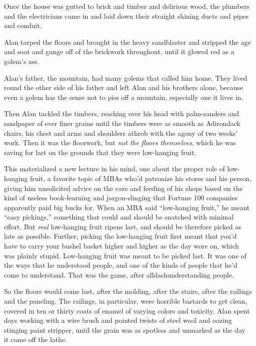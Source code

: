 Once the house was gutted to brick and timber and delirious wood, the
plumbers and the electricians came in and laid down their straight
shining ducts and pipes and conduit.

Alan tarped the floors and brought in the heavy sandblaster and
stripped the age and soot and gunge off of the brickwork throughout,
until it glowed red as a golem's ass.

Alan's father, the mountain, had many golems that called him home. 
They lived round the other side of his father and left Alan and his
brothers alone, because even a golem has the sense not to piss off a
mountain, especially one it lives in.

Then Alan tackled the timbers, reaching over his head with
palm-sanders and sandpaper of ever finer grains until the timbers were
as smooth as Adirondack chairs, his chest and arms and shoulders
athrob with the agony of two weeks' work.  Then it was the floorwork,
but \textit{not the floors themselves}, which he was saving for last
on the grounds that they were low-hanging fruit.

This materialized a new lecture in his mind, one about the proper role
of low-hanging fruit, a favorite topic of MBAs who'd patronize his
stores and his person, giving him unsolicited advice on the care and
feeding of his shops based on the kind of useless book-learning and
jargon-slinging that Fortune 100 companies apparently paid big bucks
for.  When an MBA said ``low-hanging fruit,'' he meant ``easy
pickings,'' something that could and should be snatched with minimal
effort.  But \textit{real} low-hanging fruit ripens last, and should
be therefore picked as late as possible.  Further, picking the
low-hanging fruit first meant that you'd have to carry your bushel
basket higher and higher as the day wore on, which was plainly stupid. 
Low-hanging fruit was meant to be picked last.  It was one of the ways
that he understood people, and one of the kinds of people that he'd
come to understand.  That was the game, after alldash{}understanding
people.

So the floors would come last, after the molding, after the stairs,
after the railings and the paneling.  The railings, in particular,
were horrible bastards to get clean, covered in ten or thirty coats of
enamel of varying colors and toxicity.  Alan spent days working with a
wire brush and pointed twists of steel wool and oozing stinging paint
stripper, until the grain was as spotless and unmarked as the day it
came off the lathe.

